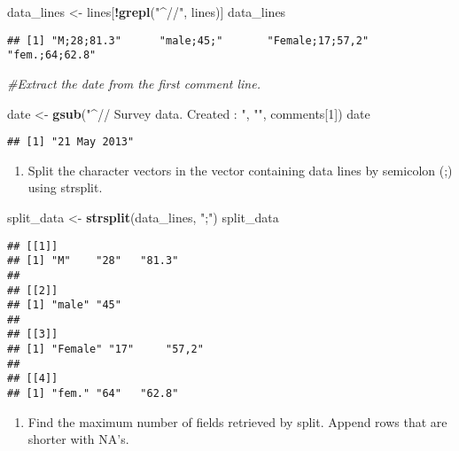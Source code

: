 \documentclass[
]{article}
\newenvironment{Shaded}{\begin{snugshade}}{\end{snugshade}}
\newcommand{\CommentTok}[1]{\textcolor[rgb]{0.56,0.35,0.01}{\textit{#1}}}
\newcommand{\DecValTok}[1]{\textcolor[rgb]{0.00,0.00,0.81}{#1}}
\newcommand{\FunctionTok}[1]{\textcolor[rgb]{0.13,0.29,0.53}{\textbf{#1}}}
\newcommand{\NormalTok}[1]{#1}
\newcommand{\OtherTok}[1]{\textcolor[rgb]{0.56,0.35,0.01}{#1}}
\newcommand{\SpecialCharTok}[1]{\textcolor[rgb]{0.81,0.36,0.00}{\textbf{#1}}}
\newcommand{\StringTok}[1]{\textcolor[rgb]{0.31,0.60,0.02}{#1}}
\providecommand{\tightlist}{%
  \setlength{\itemsep}{0pt}\setlength{\parskip}{0pt}}
\begin{document}
\begin{Shaded}
\begin{Highlighting}[]
\NormalTok{data\_lines }\OtherTok{\textless{}{-}}\NormalTok{ lines[}\SpecialCharTok{!}\FunctionTok{grepl}\NormalTok{(}\StringTok{"\^{}//"}\NormalTok{, lines)]}
\NormalTok{data\_lines}
\end{Highlighting}
\end{Shaded}

\begin{verbatim}
## [1] "M;28;81.3"      "male;45;"       "Female;17;57,2" "fem.;64;62.8"
\end{verbatim}

\begin{Shaded}
\begin{Highlighting}[]
\CommentTok{\#Extract the date from the first comment line.}

\NormalTok{date }\OtherTok{\textless{}{-}} \FunctionTok{gsub}\NormalTok{(}\StringTok{"\^{}// Survey data. Created : "}\NormalTok{, }\StringTok{""}\NormalTok{, comments[}\DecValTok{1}\NormalTok{])}
\NormalTok{date}
\end{Highlighting}
\end{Shaded}

\begin{verbatim}
## [1] "21 May 2013"
\end{verbatim}

\begin{enumerate}
\def\labelenumi{\alph{enumi}.}
\tightlist
\item
  Split the character vectors in the vector containing data lines by
  semicolon (;) using strsplit.
\end{enumerate}

\begin{Shaded}
\begin{Highlighting}[]
\NormalTok{split\_data }\OtherTok{\textless{}{-}} \FunctionTok{strsplit}\NormalTok{(data\_lines, }\StringTok{";"}\NormalTok{)}
\NormalTok{split\_data}
\end{Highlighting}
\end{Shaded}

\begin{verbatim}
## [[1]]
## [1] "M"    "28"   "81.3"
## 
## [[2]]
## [1] "male" "45"  
## 
## [[3]]
## [1] "Female" "17"     "57,2"  
## 
## [[4]]
## [1] "fem." "64"   "62.8"
\end{verbatim}

\begin{enumerate}
\def\labelenumi{\alph{enumi}.}
\setcounter{enumi}{1}
\tightlist
\item
  Find the maximum number of fields retrieved by split. Append rows that
  are shorter with NA's.
\end{enumerate}
\end{document}
